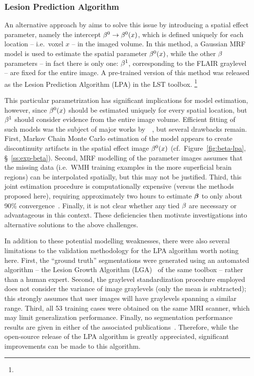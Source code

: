 \subsubsection{Lesion Prediction Algorithm}\label{sss:limits-lpa}
An alternative approach by \citeauthor{Schmidt2017a} aims to solve this issue
by introducing a spatial effect parameter, namely the intercept $\beta^0 \rightarrow \beta^0(x)$,
which is defined uniquely for each location -- i.e.\ voxel $x$ -- in the imaged volume.
In this method, a Gaussian MRF model is used to estimate the spatial parameter $\beta^0(x)$,
while the other $\beta$ parameters
-- in fact there is only one: $\beta^1$, corresponding to the FLAIR graylevel --
are fixed for the entire image.
A pre-trained version of this method was released as
the Lesion Prediction Algorithm (LPA) in the LST toolbox.%
\footnote{}
\par
This particular parametrization has significant implications for model estimation, however,
since $\beta^0(x)$ should be estimated uniquely for every spatial location,
but $\beta^1$ should consider evidence from the entire image volume.
Efficient fitting of such models was the subject of major works
by~\citeauthor{Schmidt2017}~\cite{Schmidt2017a,Schmidt2017}, but several drawbacks remain.
First, Markov Chain Monte Carlo estimation of the model
appears to create discontinuity artifacts in the spatial effect image $\beta^0(x)$
(cf.~Figure~\ref{fig:beta-lpa}, \S~\ref{ss:exp-beta}).
Second, MRF modelling of the parameter images assumes that the missing data
(i.e.\ WMH training examples in the more superficial brain regions)
can be interpolated spatially, but this may not be justified.
Third, this joint estimation procedure is computationally expensive
(versus the methods proposed here),
requiring approximately two hours to estimate $\bm{\beta}$
to only about 90\% convergence~\cite{Schmidt2017a}.
Finally, it is not clear whether any tied $\beta$ are necessary or advantageous in this context.
These deficiencies then motivate investigations into alternative solutions to the above challenges.
\par
In addition to these potential modelling weaknesses, there were also several limitations
to the validation methodology for the LPA algorithm worth noting here.
First, the ``ground truth'' segmentations were generated using an automated algorithm
-- the Lesion Growth Algorithm (LGA)~\cite{Schmidt2012} of the same toolbox --
rather than a human expert.
Second, the graylevel standardization procedure employed does not consider
the variance of image graylevels (only the mean is subtracted);
this strongly assumes that user images will have graylevels spanning a similar range.
Third, all 53 training cases were obtained on the same MRI scanner,
which may limit generalization performance.
Finally, no segmentation performance results
are given in either of the associated publications~\cite{Schmidt2017a,Schmidt2017}.
Therefore, while the open-source release of the LPA algorithm is greatly appreciated,
significant improvements can be made to this algorithm.
